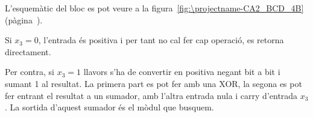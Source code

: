 L'esquemàtic del bloc es pot veure a la figura~\ref{fig:\projectname-CA2_BCD_4B} (pàgina~\pageref{fig:\projectname-CA2_BCD_4B}).

Si $x_3 = 0$, l'entrada és positiva i per tant no cal fer cap operació, es
retorna directament.

Per contra, si $x_3 = 1$ llavors s'ha de convertir en positiva negant bit a bit
i sumant 1 al resultat. La primera part es pot fer amb una \textsf{XOR}, la segona
es pot fer entrant el resultat a un sumador, amb l'altra entrada nula i carry
d'entrada $x_3$. La sortida d'aquest sumador és el mòdul que busquem.

\vspace{1cm}
